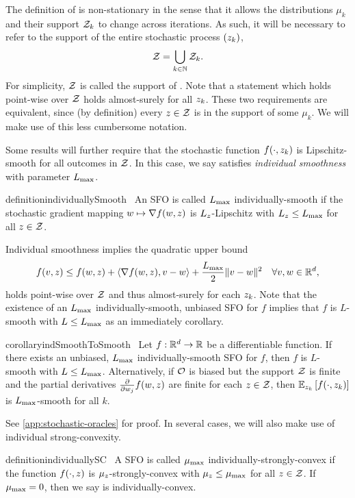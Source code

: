 The definition of \oracle{} is non-stationary in the sense that it allows the distributions \( \mu_k \) and their support \( \calZ_k \) to change across iterations.
As such, it will be necessary to refer to the support of the entire stochastic process \( \seq{\zk} \), 
\[ \calZ = \bigcup_{k\in \bbN} \calZ_k. \]
For simplicity, \( \calZ \) is called the support of \oracle{}. 
Note that a statement which holds point-wise over \( \calZ \) holds almost-surely for all \( \zk \).
These two requirements are equivalent, since (by definition) every \( \z \in \calZ \) is in the support of some \( \mu_k \).
We will make use of this less cumbersome notation. 

Some results will further require that the stochastic function \( f(\cdot, \zk) \) is Lipschitz-smooth for all outcomes in \( \calZ \).
In this case, we say \oracle{} satisfies \emph{individual smoothness} with parameter \( \Lmax \).
\begin{restatable}{definition}{individuallySmooth}~\label{def:individually-smooth}
    An \ac{SFO} \oracle{} is called \( \Lmax \) individually-smooth if the stochastic gradient mapping \( \w \mapsto \grad(\w, \z) \) is \( L_{\z} \)-Lipschitz with \( L_{\z} \leq \Lmax \) for all \( \z \in \calZ \).
\end{restatable}
\noindent Individual smoothness implies the quadratic upper bound
\[ f(v, \z) \leq f(\w, \z) + \abr{\grad(\w, \z), v - \w} + \frac{\Lmax}{2}\norm{v - \w}^2 \quad \forall v, \w \in \R^d, \]
holds point-wise over \( \calZ \) and thus almost-surely for each \( \zk \).
Note that the existence of an \( \Lmax \) individually-smooth, unbiased \ac{SFO} for \( f \) implies that \( f \) is \( L \)-smooth with \( L \leq \Lmax \) as an immediately corollary.
\begin{restatable}{corollary}{indSmoothToSmooth}~\label{cor:ind-smooth-to-smooth}
    Let \( f : \R^d \rightarrow \R \) be a differentiable function.  
    If there exists an unbiased, \( \Lmax \) individually-smooth \ac{SFO} \oracle{} for \( f \), then \( f \) is \( L \)-smooth with \( L \leq \Lmax \).
    Alternatively, if \( \oracle{} \) is biased but the support \( \calZ \) is finite and the partial derivatives \( \frac{\partial}{\partial w_j} f(\w, \z) \) are finite for each \( z \in \calZ \), then \( \Ek \sbr{f(\cdot, \zk)} \) is \( \Lmax \)-smooth for all \( k \). 
\end{restatable}
\noindent See \autoref{app:stochastic-oracles} for proof. 
In several cases, we will also make use of individual strong-convexity.
\begin{restatable}{definition}{individuallySC}~\label{def:individually-sc}
    A \ac{SFO} \oracle{} is called \( \mumax \) individually-strongly-convex if the function \( f(\cdot, \z) \) is \( \mu_{\z} \)-strongly-convex with \( \mu_{\z} \leq \mumax \) for all \( \z \in \calZ \).
    If \( \mumax = 0 \), then we say \oracle{} is individually-convex.
\end{restatable}

